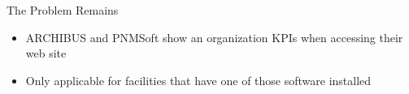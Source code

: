 \begin{frame}
	\begin{block}{The Problem Remains}
	\begin{itemize}
		\item ARCHIBUS and PNMSoft show an organization KPIs when accessing their web site
	\end{itemize}
	\begin{itemize}
		\item Only applicable for facilities that have one of those software installed
	\end{itemize}
	\end{block}
\end{frame}

